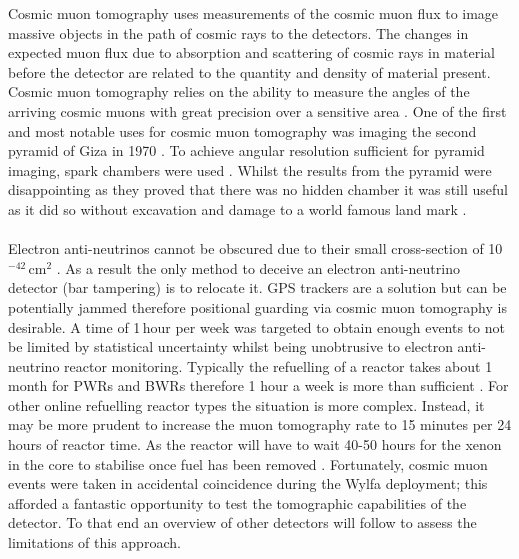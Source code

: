 Cosmic muon tomography uses measurements of the cosmic muon flux to image massive objects in the path of cosmic rays to the detectors. The changes in expected muon flux due to absorption and scattering of cosmic rays in material before the detector are related to the quantity and density of material present. Cosmic muon tomography relies on  the ability to measure the angles of the arriving cosmic muons with great precision over a sensitive area \cite{Alvarez_Pyramids_1970}. One of the first and most notable uses for cosmic muon tomography was imaging the second pyramid of Giza in 1970 \cite{Alvarez_Pyramids_1970}. To achieve angular resolution sufficient for pyramid imaging, spark chambers were used \cite{Alvarez_Pyramids_1970}. Whilst the results from the pyramid were disappointing as they proved that there was no hidden chamber it was still useful as it did so without excavation and damage to a world famous land mark \cite{Alvarez_Pyramids_1970}. 
\\\\Electron anti-neutrinos cannot be obscured due to their small cross-section of 10$^{-42}$\,cm$^2$ \cite{Vogel_1999}. As a result the only method to deceive an electron anti-neutrino detector (bar tampering) is to relocate it. GPS trackers are a solution but can be potentially jammed therefore positional guarding via cosmic muon tomography is desirable. A time of 1\,hour per week was targeted to obtain enough events to not be limited by statistical uncertainty whilst being unobtrusive to electron anti-neutrino reactor monitoring. Typically the refuelling of a reactor takes about 1 month for PWRs and BWRs therefore 1 hour a week is more than sufficient \cite{CHANG_1999_simpRefuel}. For other online refuelling reactor types the situation is more complex. Instead, it may be more prudent to increase the muon tomography rate to 15 minutes per 24 hours of reactor time. As the reactor will have to wait 40-50 hours for the xenon in the core to stabilise once fuel has been removed \cite{doeHandbook1993NucReac}. Fortunately, cosmic muon events were taken in accidental coincidence during the Wylfa deployment; this afforded a fantastic opportunity to test the tomographic capabilities of the detector. To that end an overview of other detectors will follow to assess the limitations of this approach. 
